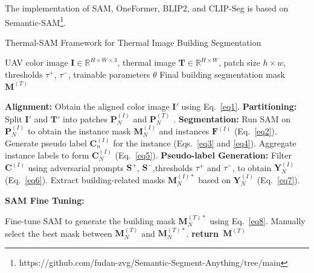 \documentclass{article}
\theoremstyle{plain}
\theoremstyle{definition}
\theoremstyle{remark}
\begin{document}
The implementation of SAM, OneFormer, BLIP2, and CLIP-Seg is based on Semantic-SAM\footnote{https://github.com/fudan-zvg/Semantic-Segment-Anything/tree/main}.
\newcommand{\RETURN}{\textbf{return}~}

\begin{algorithm}
\caption{Thermal-SAM Framework for Thermal Image Building Segmentation}
\label{alg:thermal_ssm}
\begin{algorithmic}[1]
\REQUIRE UAV color image $\bm{I} \in \mathbb{R}^{H\times W \times 3}$, thermal image $\bm{T} \in \mathbb{R}^{H\times W}$, patch size $h\times w$, thresholds $\tau^+$, $\tau^-$, trainable parameters $\theta$
\ENSURE Final building segmentation mask $\bm{M}^{(T)}$

\STATE \textbf{Alignment:} Obtain the aligned color image $\bm{I}'$ using Eq.~\eqref{eq1}.
\STATE \textbf{Partitioning:} Split $\bm{I}'$ and $\bm{T}'$ into patches $\bm{P}^{(I)}_N$ and $\bm{P}^{(T)}_N$ .
    \STATE \textbf{Segmentation:} Run SAM on $\bm{P}^{(I)}_N$ to obtain the instance mask $\bm{M}^{(I)}_N$ and instances $\bm{F}^{(I)}$ (Eq.~\eqref{eq2}).
        \STATE Generate pseudo label $\bm{C}^{(I)}_n$ for the instance  (Eqs.~\eqref{eq3} and \eqref{eq4}).
    \ENDFOR
    \STATE Aggregate instance labels to form $\bm{C}^{(I)}_N$ (Eq.~\eqref{eq5}).
\ENDFOR
\STATE \textbf{Pseudo-label Generation:} Filter $\bm{C}^{(I)}$ using adversarial prompts $\bm{S}^+$, $\bm{S}^-$,thresholds $\tau^+$ and $\tau^-$, to obtain $\bm{Y}^{(I)}_N$ (Eq.~\eqref{eq6}).
\STATE Extract building-related masks $\bm{M}^{(I)*}_N$ based on $\bm{Y}^{(I)}_N$ (Eq.~\eqref{eq7}).

\STATE \textbf{SAM Fine Tuning:} 

                \STATE Fine-tune SAM to generate the building mask 
                \STATE $\bm{M}^{(T)*}_N$ using Eq.~\eqref{eq8}.
\ENDFOR
\ENDWHILE
{}
    \STATE Manually select the best mask between $\bm{M}^{(T)}_N$ and $\bm{M}^{(T)*}_N$. 
\ENDFOR
\STATE \RETURN $\bm{M}^{(T)}$
\end{algorithmic}
\end{algorithm}
\end{document}
